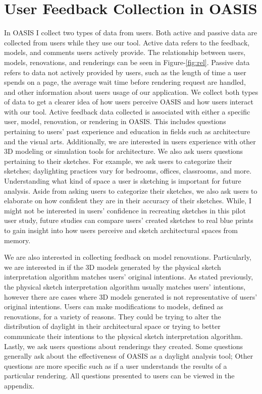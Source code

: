 \section{User Feedback  Collection in OASIS}
	In OASIS I collect two types of data from users. Both active and passive data are collected from users while they use our tool. Active data refers to the feedback, models, and comments users actively provide. The relationship between users, models, renovations, and renderings can be seen in Figure-\ref{fig:rel}. Passive data refers to data not actively provided by users, such as the length of time a user spends on a page, the average wait time before rendering request are handled, and other information about users usage of our application. We collect both types of data to get a clearer idea of how users perceive OASIS and how users interact with our tool. Active feedback data collected is associated with either a specific user, model, renovation, or rendering in OASIS. This includes questions pertaining to users' past experience and education in fields such as architecture and the visual arts. Additionally, we are interested in users experience with other 3D modeling or simulation tools for architecture. We also ask users questions pertaining to their sketches. For example, we ask users to categorize their sketches; daylighting practices vary for bedrooms, offices, classrooms, and more. Understanding what kind of space a user is sketching is important for future analysis.	Aside from asking users to categorize their sketches, we also ask users to elaborate on how confident they are in their accuracy of their sketches.  While, I might not be interested in users' confidence in recreating sketches in this pilot user study, future studies can compare users' created sketches to real blue prints to gain insight into how users perceive and sketch architectural spaces from memory.

	We are also interested in collecting feedback on model renovations. Particularly, we are interested in if the 3D models generated by the physical sketch interpretation algorithm matches users' original intentions. As stated previously, the physical sketch interpretation algorithm usually matches users' intentions, however there are cases where  3D models generated is not representative of users' original intentions. Users can make modifications to models, defined as renovations, for a variety of reasons. They could be trying to alter the distribution of daylight in their architectural space or trying to better communicate their intentions to the physical sketch interpretation algorithm. Lastly, we ask users questions about renderings they created. Some questions generally ask about the effectiveness of OASIS as a daylight analysis tool; Other questions are more specific such as if a user understands the results of a particular rendering. All questions presented to users can be viewed in the appendix.

